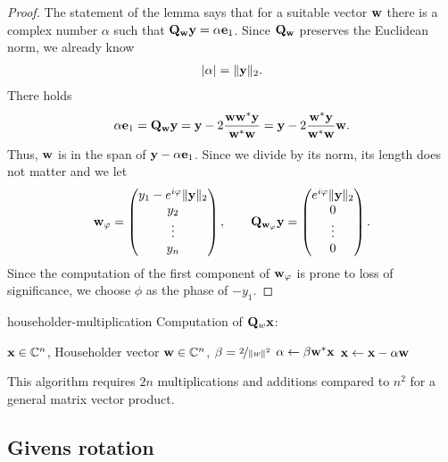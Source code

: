 \begin{proof}
  The statement of the lemma says that for a suitable vector $\mathbf w$ there is a complex number
  $\alpha$ such that $\mathbf Q_{\mathbf w} \mathbf y = \alpha \mathbf e_1$. Since
  $\mathbf Q_{\mathbf w}$ preserves the Euclidean norm, we already know
  \begin{gather}
    \lvert\alpha\rvert = \lVert\mathbf y\rVert_2.
  \end{gather}
  There holds
  \begin{gather}
    \alpha\mathbf e_1 = \mathbf Q_{\mathbf w} \mathbf y
    = \mathbf y - 2 \frac{\mathbf w\mathbf w^*\mathbf y}{\mathbf w^*\mathbf w}
    = \mathbf y - 2 \frac{\mathbf w^*\mathbf y}{\mathbf w^*\mathbf w}\mathbf w.
  \end{gather}
  Thus, $\mathbf w$ is in the span of $\mathbf y-\alpha \mathbf e_1$. Since we divide by
  its norm, its length does not matter and we let
  \begin{gather}
    \mathbf w_\varphi =
    \begin{pmatrix}
      y_1 - e^{i\varphi} \lVert\mathbf y\rVert_2\\y_2\\\vdots\\y_n
    \end{pmatrix},
    \qquad
    \mathbf Q_{\mathbf w_\varphi}\mathbf y =
    \begin{pmatrix}
      e^{i\varphi} \lVert\mathbf y\rVert_2\\0\\\vdots\\0
    \end{pmatrix}.
  \end{gather}
  Since the computation of the first component of $\mathbf w_\varphi$ is prone to loss of significance, we choose $\phi$ as the phase of $-y_1$.
\end{proof}

\begin{Algorithm}{householder-multiplication}
  Computation of $\mathbf Q_w\mathbf x$:
  \begin{algorithmic}[1]
    \Require $\mathbf x\in\mathbb C^n$, Householder vector $\mathbf w\in \mathbb C^n$, $\beta = \nicefrac2{\lVert w\rVert^2}$
    \State $\alpha \gets \beta \mathbf w^*\mathbf x$
    \State $\mathbf x \gets \mathbf x - \alpha \mathbf w$
  \end{algorithmic}
  This algorithm requires $2n$ multiplications and additions compared
  to $n^2$ for a general matrix vector product.
\end{Algorithm}

\subsection{Givens rotation}

